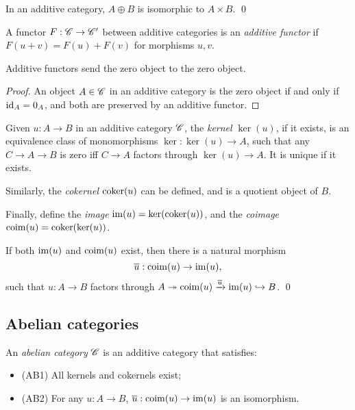 \documentclass[11pt]{amsart}
\begin{document}
\begin{prop}
    In an additive category, $A\oplus B$ is isomorphic to $A\times B$. \qed
\end{prop}

\begin{defn}
    A functor $F:\mathscr{C}\to \mathscr{C}'$ between additive categories is an \emph{additive functor} if $F(u+v) = F(u) + F(v)$ for morphisms $u,v$.
\end{defn}

\begin{prop}
    Additive functors send the zero object to the zero object.
\end{prop}

\begin{proof}
    An object $A\in \mathscr{C}$ in an additive category is the zero object if and only if $\operatorname{id}_A = 0_A$, and both are preserved by an additive functor.
\end{proof}

\begin{defn}
    Given $u:A\to B$ in an additive category $\mathscr{C}$, the \emph{kernel} $\ker(u)$, if it exists, is an equivalence class of monomorphisms $\ker: \ker(u) \to A$, such that any $C\to A \to B$ is zero iff $C\to A$ factors through $\ker(u)\to A$. It is unique if it exists.

    Similarly, the \emph{cokernel} $\operatorname{coker}(u)$ can be defined, and is a quotient object of $B$.

    Finally, define the \emph{image} $\operatorname{im}(u) = \ker(\operatorname{coker}(u))$, and the \emph{coimage} $\operatorname{coim}(u) = \operatorname{coker}(\ker(u))$.
\end{defn}

\begin{prop}
    If both $\operatorname{im}(u)$ and $\operatorname{coim}(u)$ exist, then there is a natural morphism 
    \[\overline{u}: \operatorname{coim}(u) \to \operatorname{im}(u),\]
    such that $u:A\to B$ factors through
    $A\twoheadrightarrow \operatorname{coim}(u) \xrightarrow{\overline{u}} \operatorname{im}(u) \hookrightarrow B$. \qed
\end{prop}


\subsection{Abelian categories}

\begin{defn}
    An \emph{abelian category} $\mathscr{C}$ is an additive category that satisfies:
    \begin{itemize}
        \item (AB1) All kernels and cokernels exist;
        \item (AB2) For any $u:A\to B$, $\overline{u}:\operatorname{coim}(u) \to \operatorname{im}(u)$ is an isomorphism.
    \end{itemize}
\end{defn}
\end{document}
